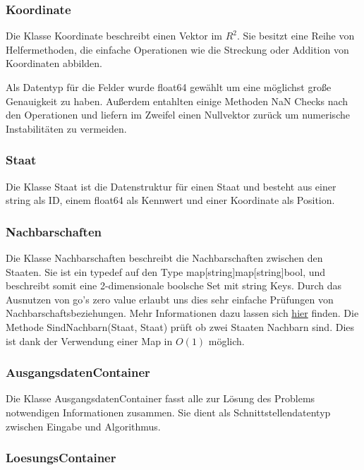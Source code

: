 \subsubsection{Koordinate}

Die Klasse Koordinate beschreibt einen Vektor im $ R^2 $.
Sie besitzt eine  Reihe von Helfermethoden, die einfache Operationen wie die Streckung oder Addition von Koordinaten abbilden.

Als Datentyp für die Felder wurde float64 gewählt um eine möglichst große Genauigkeit zu haben.
Außerdem entahlten einige Methoden NaN Checks nach den Operationen und liefern im Zweifel einen Nullvektor zurück um numerische Instabilitäten zu vermeiden.

\subsubsection{Staat}

Die Klasse Staat ist die Datenstruktur für einen Staat und besteht aus einer string als ID, einem float64 als Kennwert und einer Koordinate als Position.


\subsubsection{Nachbarschaften}

Die Klasse Nachbarschaften beschreibt die Nachbarschaften zwischen den Staaten.
Sie ist ein typedef auf den Type map[string]map[string]bool, und beschreibt somit eine 2-dimensionale boolsche Set mit string Keys.
Durch das Ausnutzen von go's zero value erlaubt uns dies sehr einfache Prüfungen von Nachbarschaftsbeziehungen.
Mehr Informationen dazu lassen sich \href{https://blog.golang.org/go-maps-in-action}{hier} finden.
Die Methode SindNachbarn(Staat, Staat) prüft ob zwei Staaten Nachbarn sind. Dies ist dank der Verwendung einer Map in $ O(1) $ möglich.

\subsubsection{AusgangsdatenContainer}

Die Klasse AusgangsdatenContainer fasst alle zur Lösung des Problems notwendigen Informationen zusammen.
Sie dient als Schnittstellendatentyp zwischen Eingabe und Algorithmus.

\subsubsection{LoesungsContainer}

